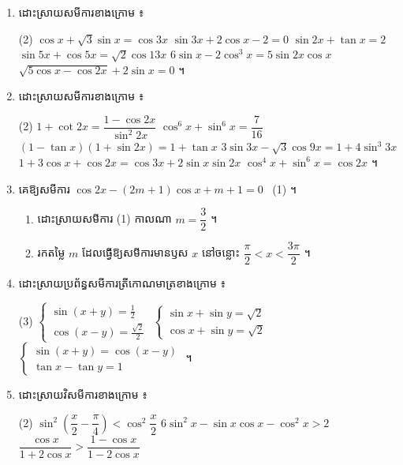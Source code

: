 \begin{enumerate}[1]
  \item ដោះស្រាយសមីការខាងក្រោម ៖
  \begin{tasks}(2)
    \task $\cos x + \sqrt{3}\sin x = \cos 3x$
    \task $\sin 3x + 2\cos x - 2 = 0$
    \task $\sin 2x + \tan x = 2$
    \task $\sin 5x + \cos 5x = \sqrt{2}\cos 13x$
    \task $6\sin x - 2\cos^3 x = 5\sin 2x\cos x$
    \task $\sqrt{5\cos x - \cos 2x} + 2\sin x = 0$ ។
  \end{tasks}
  \item ដោះស្រាយសមីការខាងក្រោម ៖
  \begin{tasks}(2)
    \task $1 + \cot 2x = \dfrac{1 - \cos 2x}{\sin^2 2x}$
    \task $\cos^6 x + \sin^6 x = \dfrac{7}{16}$
    \task $(1 - \tan x)(1 + \sin 2x) = 1 + \tan x$
    \task $3\sin 3x - \sqrt{3}\cos 9x = 1 + 4\sin^3 3x$
    \task $1 + 3\cos x + \cos 2x = \cos 3x + 2\sin x\sin 2x$
    \task $\cos^4 x + \sin^6 x = \cos 2x$ ។
  \end{tasks}
  \item គេឱ្យសមីការ $\cos 2x - (2m + 1)\cos x + m + 1 = 0$ \ (1) ។
  \begin{enumerate}[a]
    \item ដោះស្រាយសមីការ (1) កាលណា $m = \dfrac{3}{2}$ ។
    \item រកតម្លៃ $m$ ដែលធ្វើឱ្យសមីការមានឫស $x$ នៅចន្លោះ $\dfrac{\pi}{2} < x < \dfrac{3\pi}{2}$ ។
  \end{enumerate}
  \item ដោះស្រាយប្រព័ន្ធសមីការត្រីកោណមាត្រខាងក្រោម ៖
  \begin{tasks}(3)
    \task $\begin{cases} \sin(x + y) = \frac{1}{2}\\ \cos(x - y) = \frac{\sqrt{2}}{2} \end{cases}$
    \task $\begin{cases} \sin x + \sin y = \sqrt{2}\\ \cos x + \sin y = \sqrt{2} \end{cases}$
    \task $\begin{cases} \sin(x + y) = \cos(x - y)\\ \tan x - \tan y = 1 \end{cases}$ ។
  \end{tasks}
  \item ដោះស្រាយវិសមីការខាងក្រោម ៖
  \begin{tasks}(2)
    \task $\sin^2\left(\dfrac{x}{2} - \dfrac{\pi}{4}\right) < \cos^2\dfrac{x}{2}$
    \task $6\sin^2 x - \sin x\cos x - \cos^2 x > 2$
    \task $\dfrac{\cos x}{1 + 2\cos x} > \dfrac{1 - \cos x}{1 - 2\cos x}$

\end{tasks}
\end{enumerate}
